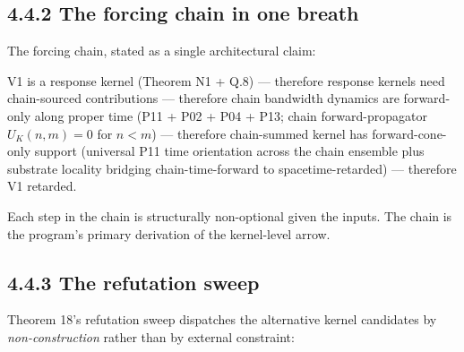 \documentclass[11pt]{book}
\begin{document}
\subsection{4.4.2 The forcing chain in one breath}

The forcing chain, stated as a single architectural claim:

V1 is a response kernel (Theorem N1 + Q.8) — therefore response kernels need chain-sourced contributions — therefore chain bandwidth dynamics are forward-only along proper time (P11 + P02 + P04 + P13; chain forward-propagator $U_K(n,m) = 0$ for $n < m$) — therefore chain-summed kernel has forward-cone-only support (universal P11 time orientation across the chain ensemble plus substrate locality bridging chain-time-forward to spacetime-retarded) — therefore V1 retarded.

Each step in the chain is structurally non-optional given the inputs. The chain is the program's primary derivation of the kernel-level arrow.

\subsection{4.4.3 The refutation sweep}

Theorem 18's refutation sweep dispatches the alternative kernel candidates by \textit{non-construction} rather than by external constraint:
\end{document}
